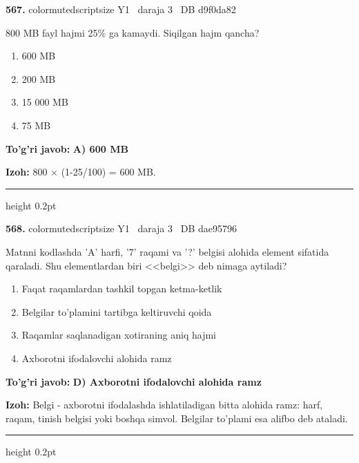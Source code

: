 \documentclass[10pt,a4paper,oneside]{article}
\begin{document}
\noindent\textbf{\color{ink}567.}  {color{muted}scriptsize Y1 \textbullet\ daraja 3 \textbullet\ DB d9f0da82}
\par
800 MB fayl hajmi 25\% ga kamaydi. Siqilgan hajm qancha?
\begin{enumerate}[label=\Alph*),leftmargin=9mm]
\item 600 MB
\item 200 MB
\item 15 000 MB
\item 75 MB
\end{enumerate}
\begin{tcolorbox}[enhanced,breakable,colback=teal!4,colframe=teal!50!black,boxrule=0.5pt,arc=1.1mm,left=3mm,right=3mm,top=1.7mm,bottom=1.7mm,before skip=2mm,after skip=2mm]
\textbf{\color{teal}To'g'ri javob:} \textbf{A) 600 MB}
\par\smallskip
\textbf{Izoh:} 800 \ensuremath{\times} (1-25/100) = 600 MB.
\end{tcolorbox}
\vspace{2mm}\hrule height 0.2pt \vspace{3mm}

\noindent\textbf{\color{ink}568.}  {color{muted}scriptsize Y1 \textbullet\ daraja 3 \textbullet\ DB dae95796}
\par
Matnni kodlashda 'A' harfi, '7' raqami va '?' belgisi alohida element sifatida qaraladi. Shu elementlardan biri <<belgi>> deb nimaga aytiladi?
\begin{enumerate}[label=\Alph*),leftmargin=9mm]
\item Faqat raqamlardan tashkil topgan ketma-ketlik
\item Belgilar to'plamini tartibga keltiruvchi qoida
\item Raqamlar saqlanadigan xotiraning aniq hajmi
\item Axborotni ifodalovchi alohida ramz
\end{enumerate}
\begin{tcolorbox}[enhanced,breakable,colback=teal!4,colframe=teal!50!black,boxrule=0.5pt,arc=1.1mm,left=3mm,right=3mm,top=1.7mm,bottom=1.7mm,before skip=2mm,after skip=2mm]
\textbf{\color{teal}To'g'ri javob:} \textbf{D) Axborotni ifodalovchi alohida ramz}
\par\smallskip
\textbf{Izoh:} Belgi - axborotni ifodalashda ishlatiladigan bitta alohida ramz: harf, raqam, tinish belgisi yoki boshqa simvol. Belgilar to'plami esa alifbo deb ataladi.
\end{tcolorbox}
\vspace{2mm}\hrule height 0.2pt \vspace{3mm}
\end{document}
